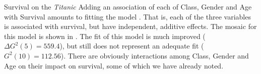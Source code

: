 \begin{Example}[titanic]{Survival on the \emph{Titanic}}
Adding an association of each of Class, Gender and Age with Survival
amounts to fitting the model
.  That is, each of the three variables is
associated with survival, but have independent, additive effects. The mosaic for this model is shown in .
The fit of this model is much improved ($\Delta G^2 (5) = 559.4$), but still does not represent
an adequate fit ($G^2 (10) = 112.56$).
There are obviously interactions among Class, Gender and Age on their
impact on survival, some of which we have already noted.
%
\begin{figure}[htb]
 \begin{subfigmatrix}{2}
\end{subfigmatrix}
\end{figure}
\end{Example}

